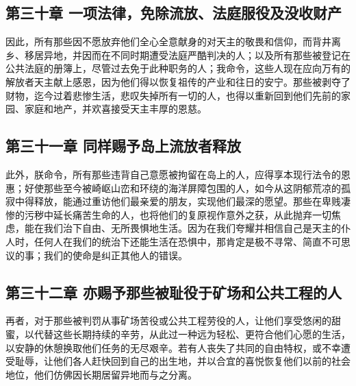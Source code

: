 
\subsection{第三十章 一项法律，免除流放、法庭服役及没收财产}

因此，所有那些因不愿放弃他们全心全意献身的对天主的敬畏和信仰，而背井离乡、移居异地，并因而在不同时期遭受法庭严酷判决的人；以及所有那些被登记在公共法庭的册簿上，尽管过去免于此种职务的人；我命令，这些人现在应向万有的解放者天主献上感恩，因为他们得以恢复祖传的产业和往日的安宁。那些被剥夺了财物，迄今过着悲惨生活，悲叹失掉所有一切的人，也得以重新回到他们先前的家园、家庭和地产，并欢喜接受天主丰厚的恩慈。\par


\subsection{第三十一章 同样赐予岛上流放者释放}

此外，朕命令，所有那些违背自己意愿被拘留在岛上的人，应得享本现行法令的恩惠；好使那些至今被崎岖山峦和环绕的海洋屏障包围的人，如今从这阴郁荒凉的孤寂中得释放，能通过重访他们最亲爱的朋友，实现他们最深的愿望。那些在卑贱凄惨的污秽中延长痛苦生命的人，也将他们的复原视作意外之获，从此抛弃一切焦虑，能在我们治下自由、无所畏惧地生活。因为在我们夸耀并相信自己是天主的仆人时，任何人在我们的统治下还能生活在恐惧中，那肯定是极不寻常、简直不可思议的事；我们的使命是纠正其他人的错误。\par


\subsection{第三十二章 亦赐予那些被耻役于矿场和公共工程的人}

再者，对于那些被判罚从事矿场苦役或公共工程劳役的人，让他们享受悠闲的甜蜜，以代替这些长期持续的辛劳，从此过一种远为轻松、更符合他们心愿的生活，以安静的休憩换取他们任务的无尽艰辛。若有人丧失了共同的自由特权，或不幸遭受耻辱，让他们各人赶快回到自己的出生地，并以合宜的喜悦恢复他们以前的社会地位，他们仿佛因长期居留异地而与之分离。\par

